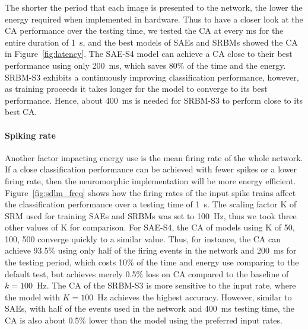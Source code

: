 The shorter the period that each image is presented to the network, the lower the energy required when implemented in hardware.
Thus to have a closer look at the CA performance over the testing time, we tested the CA at every ms for the entire duration of 1~s, and the best models of SAEs and SRBMs showed the CA in Figure~\ref{fig:latency}.
The SAE-S4 model can achieve a CA close to their best performance using only 200~ms, which saves 80\% of the time and the energy.
SRBM-S3 exhibits a continuously improving classification performance, however, as training proceeds it takes longer for the model to converge to its best performance.
Hence, about 400~ms is needed for SRBM-S3 to perform close to its best CA.

\paragraph{Spiking rate\\}

Another factor impacting energy use is the mean firing rate of the whole network.
If a close classification performance can be achieved with fewer spikes or a lower firing rate, then the neuromorphic implementation will be more energy efficient.
Figure~\ref{fig:sdlm_freq} shows how the firing rates of the input spike trains affect the classification performance over a testing time of 1~s.
The scaling factor K of SRM used for training SAEs and SRBMs was set to 100~Hz, thus we took three other values of K for comparison.
For SAE-S4, the CA of models using K of 50, 100, 500 converge quickly to a similar value.
Thus, for instance, the CA can achieve 93.5\% using only half of the firing events in the network and 200~ms for the testing period, which costs 10\% of the time and energy use comparing to the default test, but achieves merely 0.5\% loss on CA compared to the baseline of $k=100$~Hz.
The CA of the SRBM-S3 is more sensitive to the input rate, where the model with $K=100$~Hz achieves the highest accuracy.
However, similar to SAEs, with half of the events used in the network and 400~ms testing time, the CA is also about 0.5\% lower than the model using the preferred input rates.

